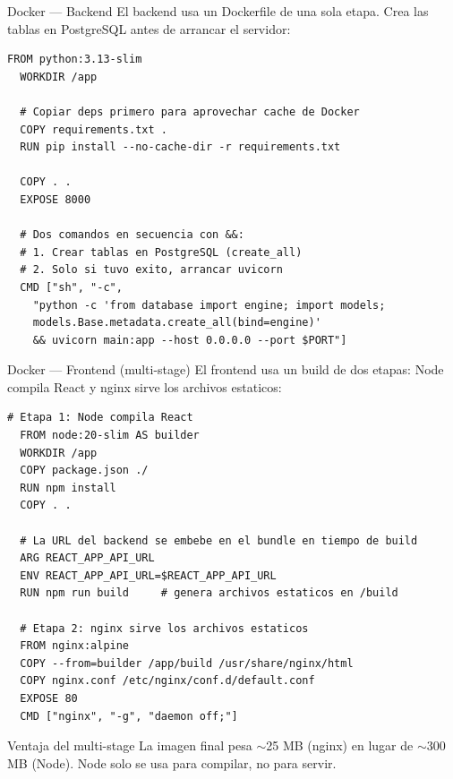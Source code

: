\documentclass[aspectratio=169]{beamer}
\begin{document}
\begin{frame}[fragile]{Docker --- Backend}
  El backend usa un Dockerfile de una sola etapa. Crea las tablas en PostgreSQL antes de arrancar el servidor:

  \vspace{0.1cm}

\begin{lstlisting}[style=yaml, basicstyle=\ttfamily\footnotesize\color{white}]
  FROM python:3.13-slim
  WORKDIR /app

  # Copiar deps primero para aprovechar cache de Docker
  COPY requirements.txt .
  RUN pip install --no-cache-dir -r requirements.txt

  COPY . .
  EXPOSE 8000

  # Dos comandos en secuencia con &&:
  # 1. Crear tablas en PostgreSQL (create_all)
  # 2. Solo si tuvo exito, arrancar uvicorn
  CMD ["sh", "-c",
    "python -c 'from database import engine; import models;
    models.Base.metadata.create_all(bind=engine)'
    && uvicorn main:app --host 0.0.0.0 --port $PORT"]
  \end{lstlisting}

\end{frame}

\begin{frame}[fragile]{Docker --- Frontend (multi-stage)}
  El frontend usa un build de dos etapas: Node compila React y nginx sirve los archivos estaticos:

\begin{lstlisting}[style=yaml, basicstyle=\ttfamily\footnotesize\color{white}]
  # Etapa 1: Node compila React
  FROM node:20-slim AS builder
  WORKDIR /app
  COPY package.json ./
  RUN npm install
  COPY . .

  # La URL del backend se embebe en el bundle en tiempo de build
  ARG REACT_APP_API_URL
  ENV REACT_APP_API_URL=$REACT_APP_API_URL
  RUN npm run build     # genera archivos estaticos en /build

  # Etapa 2: nginx sirve los archivos estaticos
  FROM nginx:alpine
  COPY --from=builder /app/build /usr/share/nginx/html
  COPY nginx.conf /etc/nginx/conf.d/default.conf
  EXPOSE 80
  CMD ["nginx", "-g", "daemon off;"]
  \end{lstlisting}

  \vspace{0.2cm}
  \begin{exampleblock}{Ventaja del multi-stage}
    La imagen final pesa $\sim$25 MB (nginx) en lugar de $\sim$300 MB (Node). Node solo se usa para compilar, no para servir.
  \end{exampleblock}
\end{frame}
\end{document}
